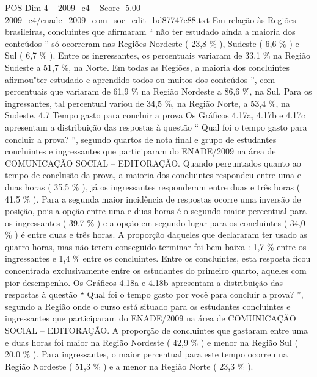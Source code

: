 \begin{textsample}{POS Dim 4 – 2009\_c4 – Score -5.00 – 2009\_c4/enade\_2009\_com\_soc\_edit\_bd87747c88.txt}
Em relação às Regiões brasileiras, concluintes que afirmaram “ não ter estudado ainda a maioria dos conteúdos ” só ocorreram nas Regiões Nordeste ( 23,8 \% ), Sudeste ( 6,6 \% ) e Sul ( 6,7 \% ).
Entre os ingressantes, os percentuais variaram de 33,1 \% na Região Sudeste a 51,7 \%, na Norte.
Em todas as Regiões, a maioria dos concluintes afirmou"ter estudado e aprendido todos ou muitos dos conteúdos ”, com percentuais que variaram de 61,9 \% na Região Nordeste a 86,6 \%, na Sul.
Para os ingressantes, tal percentual variou de 34,5 \%, na Região Norte, a 53,4 \%, na Sudeste. 4.7 Tempo gasto para concluir a prova Os Gráficos 4.17a, 4.17b e 4.17c apresentam a distribuição das respostas à questão “ Qual foi o tempo gasto para concluir a prova? ”, segundo quartos de nota final e grupo de estudantes concluintes e ingressantes que participaram do ENADE/2009 na área de COMUNICAÇÃO SOCIAL – EDITORAÇÃO.
Quando perguntados quanto ao tempo de conclusão da prova, a maioria dos concluintes respondeu entre uma e duas horas ( 35,5 \% ), já os ingressantes responderam entre duas e três horas ( 41,5 \% ).
Para a segunda maior incidência de respostas ocorre uma inversão de posição, pois a opção entre uma e duas horas é o segundo maior percentual para os ingressantes ( 39,7 \% ) e a opção em segundo lugar para os concluintes ( 34,0 \% ) é entre duas e três horas.
A proporção daqueles que declararam ter usado as quatro horas, mas não terem conseguido terminar foi bem baixa : 1,7 \% entre os ingressantes e 1,4 \% entre os concluintes.
Entre os concluintes, esta resposta ficou concentrada exclusivamente entre os estudantes do primeiro quarto, aqueles com pior desempenho.
Os Gráficos 4.18a e 4.18b apresentam a distribuição das respostas à questão “ Qual foi o tempo gasto por você para concluir a prova? ”, segundo a Região onde o curso está situado para os estudantes concluintes e ingressantes que participaram do ENADE/2009 na área de COMUNICAÇÃO SOCIAL – EDITORAÇÃO.
A proporção de concluintes que gastaram entre uma e duas horas foi maior na Região Nordeste ( 42,9 \% ) e menor na Região Sul ( 20,0 \% ).
Para ingressantes, o maior percentual para este tempo ocorreu na Região Nordeste ( 51,3 \% ) e a menor na Região Norte ( 23,3 \% ).

\end{textsample}
